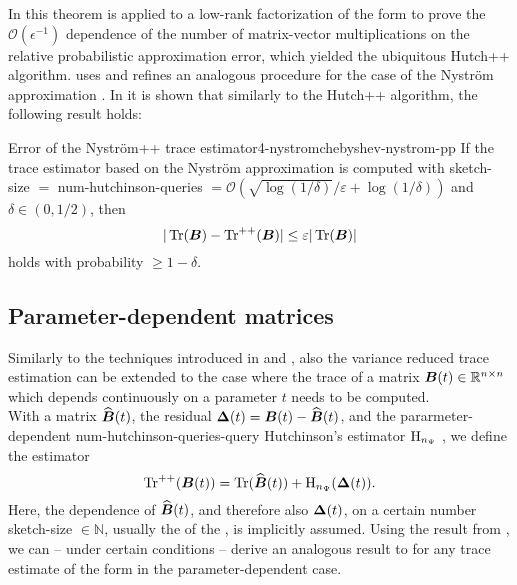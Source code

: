 In \cite{meyer2021hutch} this theorem is applied to a low-rank factorization of
the form  to prove the $\mathcal{O}(\epsilon^{-1})$
dependence of the number of matrix-vector multiplications on the relative probabilistic
approximation error, which yielded the ubiquitous Hutch++ algorithm.
\cite{lin2017randomized} uses and \cite{persson2022hutch} refines an analogous procedure for the
case of the Nystr\"om approximation . In \cite[theorem~3.4]{persson2022hutch}
it is shown that similarly to the Hutch++ algorithm, the following result holds:
\begin{theorem}{Error of the Nystr\"om++ trace estimator}{4-nystromchebyshev-nystrom-pp}
    If the trace estimator  based
    on the Nystr\"om approximation  is computed
    with \gls{sketch-size} $=$ \gls{num-hutchinson-queries} $= \mathcal{O}(\sqrt{\log(1/\delta)}/\varepsilon + \log(1/\delta))$
    and $\delta \in (0, 1/2)$, then
    \begin{equation}
        |\operatorname{Tr}(\boldsymbol{B}) - \operatorname{Tr}^{++}(\boldsymbol{B})| \leq \varepsilon |\operatorname{Tr}(\boldsymbol{B})|
    \end{equation}
    holds with probability $\geq 1-\delta$.
\end{theorem}

\subsection{Parameter-dependent matrices}
\label{subsec:4-nystromchebyshev-reduction-parametrized-matrices}

Similarly to the techniques introduced in  and ,
also the variance reduced trace estimation can be extended to the case where
the trace of a matrix $\boldsymbol{B}(t) \in \mathbb{R}^{n \times n}$ which depends continuously on a parameter $t$
needs to be computed.\\

With a matrix $\widehat{\boldsymbol{B}}(t)$, the residual $\boldsymbol{\Delta}(t) = \boldsymbol{B}(t) - \widehat{\boldsymbol{B}}(t)$,
and the pararmeter-dependent \gls{num-hutchinson-queries}-query Hutchinson's estimator $\operatorname{H}_{n_{\Psi}}$
, we define the estimator 
\begin{equation}
    \operatorname{Tr}^{++}(\boldsymbol{B}(t)) = \operatorname{Tr}(\widehat{\boldsymbol{B}}(t)) + \operatorname{H}_{n_{\Psi}}(\boldsymbol{\Delta}(t)).
    \label{equ:4-nystromchebyshev-parameter-hutch-pp}
\end{equation}
Here, the dependence of $\widehat{\boldsymbol{B}}(t)$, and therefore also $\boldsymbol{\Delta}(t)$,
on a certain number \gls{sketch-size} $\in \mathbb{N}$, usually the 
of the , is implicitly assumed.
Using the result from ,
we can -- under certain conditions -- derive an analogous result
to  for any trace estimate of the form
 in the parameter-dependent case.

